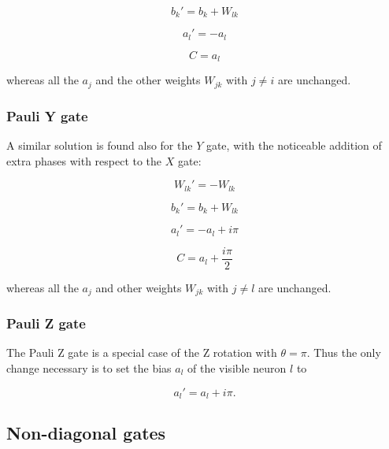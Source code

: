 \begin{equation}
   b_{k}\prime = b_{k} + W_{lk}
\end{equation}

\begin{equation}
   a_{l}\prime = -a_{l}
\end{equation}

\begin{equation}
   C = a_{l}
\end{equation}

whereas all the $a_{j}$ and the other weights $W_{jk}$ with $j \neq i$ are unchanged.

\subsubsection{Pauli Y gate}
A similar solution is found also for the $Y$ gate, with the noticeable addition of extra phases
with respect to the $X$ gate:

\begin{equation}
   W_{lk}\prime = -W_{lk}
\end{equation}

\begin{equation}
   b_{k}\prime = b_{k} + W_{lk}
\end{equation}

\begin{equation}
   a_{l}\prime = -a_{l} + i \pi
\end{equation}

\begin{equation}
   C = a_{l} + \frac{i \pi}{2}
\end{equation}

whereas all the $a_{j}$ and other weights $W_{jk}$ with $j \neq l$ are unchanged.

\subsubsection{Pauli Z gate}
The Pauli Z gate is a special case of the Z rotation with $\theta = \pi$. Thus the 
only change necessary is to set the bias $a_l$ of the visible neuron $l$ to

\begin{equation}
    a_{l}\prime = a_{l} + i \pi.
\end{equation}

\subsection{Non-diagonal gates}

